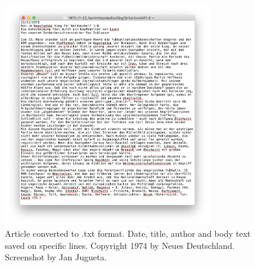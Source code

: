 \documentclass[unknownkeysallowed,usepdftitle=false,aspectratio=169, parskip=full]{beamer}
\begin{document}
\begin{frame}
\begin{columns}[t]
\begin{column}[c]{0.45\textwidth}
\begin{figure}[h]
\includegraphics[width=0.8\textwidth,height=0.8\textheight,keepaspectratio]{figure/nuntxt.png}
\caption{Article converted to .txt format. Date, title, author and body text saved on specific lines. Copyright 1974 by Neues Deutschland.
Screenshot by Jan Jugueta.}
\end{figure}
    \end{column}
    
  \end{columns}

  
\end{frame}
\end{document}
